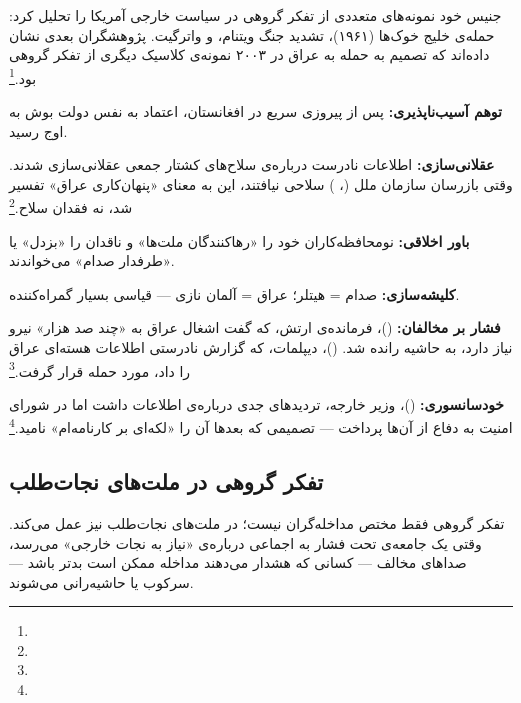 جنیس خود نمونه‌های متعددی از تفکر گروهی در سیاست خارجی آمریکا را تحلیل کرد: حمله‌ی خلیج خوک‌ها (۱۹۶۱)، تشدید جنگ ویتنام، و واترگیت. پژوهشگران بعدی نشان داده‌اند که تصمیم به حمله به عراق در ۲۰۰۳ نمونه‌ی کلاسیک دیگری از تفکر گروهی بود.\footnote{}

\begin{tcolorbox}[casebox, title={مطالعه‌ی موردی: تفکر گروهی و تصمیم حمله به عراق ۲۰۰۳}]
\textbf{توهم آسیب‌ناپذیری:} پس از پیروزی سریع در افغانستان، اعتماد به نفس دولت بوش به اوج رسید.

\textbf{عقلانی‌سازی:} اطلاعات نادرست درباره‌ی سلاح‌های کشتار جمعی عقلانی‌سازی شدند. وقتی بازرسان سازمان ملل (، ) سلاحی نیافتند، این به معنای «پنهان‌کاری عراق» تفسیر شد، نه فقدان سلاح.\footnote{}

\textbf{باور اخلاقی:} نومحافظه‌کاران خود را «رهاکنندگان ملت‌ها» و ناقدان را «بزدل» یا «طرفدار صدام» می‌خواندند.

\textbf{کلیشه‌سازی:} صدام = هیتلر؛ عراق = آلمان نازی — قیاسی بسیار گمراه‌کننده.

\textbf{فشار بر مخالفان:}  ()، فرمانده‌ی ارتش، که گفت اشغال عراق به «چند صد هزار» نیرو نیاز دارد، به حاشیه رانده شد.  ()، دیپلمات، که گزارش نادرستی اطلاعات هسته‌ای عراق را داد، مورد حمله قرار گرفت.\footnote{}

\textbf{خودسانسوری:}  ()، وزیر خارجه، تردیدهای جدی درباره‌ی اطلاعات داشت اما در شورای امنیت به دفاع از آن‌ها پرداخت — تصمیمی که بعدها آن را «لکه‌ای بر کارنامه‌ام» نامید.\footnote{}
\end{tcolorbox}

\subsection{تفکر گروهی در ملت‌های نجات‌طلب}
\label{subsec:ch11-groupthink-nation}

تفکر گروهی فقط مختص مداخله‌گران نیست؛ در ملت‌های نجات‌طلب نیز عمل می‌کند. وقتی یک جامعه‌ی تحت فشار به اجماعی درباره‌ی «نیاز به نجات خارجی» می‌رسد، صداهای مخالف — کسانی که هشدار می‌دهند مداخله ممکن است بدتر باشد — سرکوب یا حاشیه‌رانی می‌شوند.

